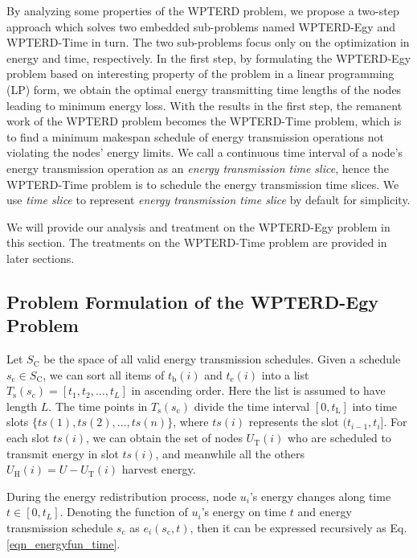 \documentclass[journal,10pt]{IEEEtran}
\begin{document}
By analyzing some properties of the WPTERD problem, we propose a two-step approach which solves two embedded sub-problems named WPTERD-Egy and WPTERD-Time in turn. The two sub-problems focus only on the optimization in energy and time, respectively. In the first step, by formulating the WPTERD-Egy problem based on interesting property of the problem in a linear programming (LP) form, we obtain the optimal energy transmitting time lengths of the nodes leading to minimum energy loss. With the results in the first step, the remanent work of the WPTERD problem becomes the WPTERD-Time problem, which is to find a minimum makespan schedule of energy transmission operations not violating the nodes' energy limits. We call a continuous time interval of a node's energy transmission operation as an \textit{energy transmission time slice}, hence the WPTERD-Time problem is to schedule the energy transmission time slices. We use \textit{time slice} to represent \textit{energy transmission time slice} by default for simplicity.

We will provide our analysis and treatment on the WPTERD-Egy problem in this section. The treatments on the WPTERD-Time problem are provided in later sections.

\subsection{Problem Formulation of the WPTERD-Egy Problem}

Let $S_\text{C}$ be the space of all valid energy transmission schedules. Given a schedule $s_\text{c}{\in}S_\text{C}$, we can sort all items of $t_\text{b}(i)$ and $t_\text{e}(i)$ into a list $T_\text{s}(s_\text{c}){=}[t_1,t_2,\ldots,t_{L}]$ in ascending order. Here the list is assumed to have length $L$. The time points in $T_\text{s}(s_\text{c})$ divide the time interval $[0,t_\text{L}]$ into time slots $\{ts(1),ts(2),\ldots,ts(n)\}$, where $ts(i)$ represents the slot $(t_{i{-}1},t_i]$. For each slot $ts(i)$, we can obtain the set of nodes $U_\text{T}(i)$ who are scheduled to transmit energy in slot $ts(i)$, and meanwhile all the others $U_\text{H}(i){=}U{-}U_\text{T}(i)$ harvest energy.

During the energy redistribution process, node $u_i$'s energy changes along time $t{\in}[0,t_{L}]$. Denoting the function of $u_i$'s energy on time $t$ and energy transmission schedule $s_\text{c}$ as $e_i(s_\text{c},t)$, then it can be expressed recursively as Eq.\eqref{eqn_energyfun_time}.
\end{document}
